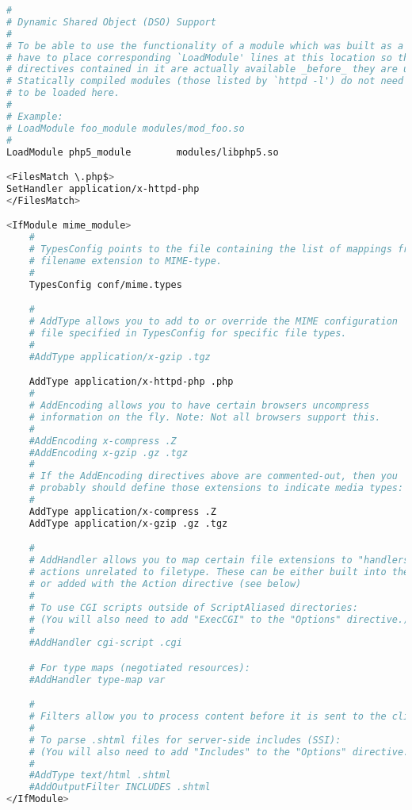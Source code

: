 \begin{lstlisting}[language=bash]
#
# Dynamic Shared Object (DSO) Support
#
# To be able to use the functionality of a module which was built as a DSO you
# have to place corresponding `LoadModule' lines at this location so the
# directives contained in it are actually available _before_ they are used.
# Statically compiled modules (those listed by `httpd -l') do not need
# to be loaded here.
#
# Example:
# LoadModule foo_module modules/mod_foo.so
#
LoadModule php5_module        modules/libphp5.so

<FilesMatch \.php$>
SetHandler application/x-httpd-php
</FilesMatch>

<IfModule mime_module>
    #
    # TypesConfig points to the file containing the list of mappings from
    # filename extension to MIME-type.
    #
    TypesConfig conf/mime.types

    #
    # AddType allows you to add to or override the MIME configuration
    # file specified in TypesConfig for specific file types.
    #
    #AddType application/x-gzip .tgz

    AddType application/x-httpd-php .php
    #
    # AddEncoding allows you to have certain browsers uncompress
    # information on the fly. Note: Not all browsers support this.
    #
    #AddEncoding x-compress .Z
    #AddEncoding x-gzip .gz .tgz
    #
    # If the AddEncoding directives above are commented-out, then you
    # probably should define those extensions to indicate media types:
    #
    AddType application/x-compress .Z
    AddType application/x-gzip .gz .tgz

    #
    # AddHandler allows you to map certain file extensions to "handlers":
    # actions unrelated to filetype. These can be either built into the server
    # or added with the Action directive (see below)
    #
    # To use CGI scripts outside of ScriptAliased directories:
    # (You will also need to add "ExecCGI" to the "Options" directive.)
    #
    #AddHandler cgi-script .cgi

    # For type maps (negotiated resources):
    #AddHandler type-map var

    #
    # Filters allow you to process content before it is sent to the client.
    #
    # To parse .shtml files for server-side includes (SSI):
    # (You will also need to add "Includes" to the "Options" directive.)
    #
    #AddType text/html .shtml
    #AddOutputFilter INCLUDES .shtml
</IfModule>
\end{lstlisting}

